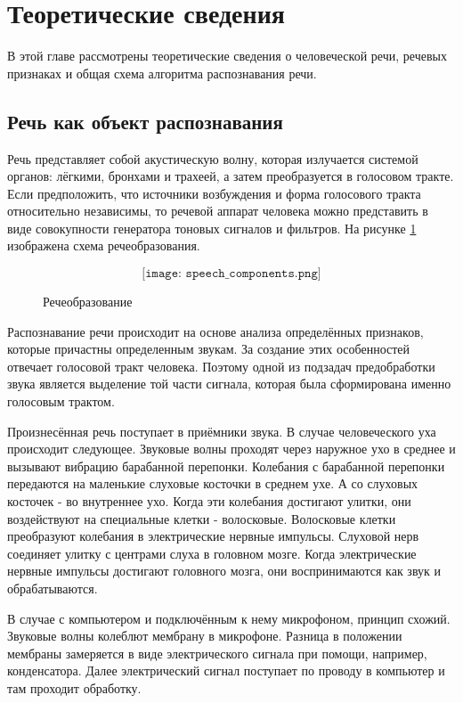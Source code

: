 \section{Теоретические сведения}
В этой главе рассмотрены теоретические сведения о человеческой речи, речевых признаках и общая схема алгоритма распознавания речи.

\subsection{Речь как объект распознавания}
Речь представляет собой акустическую волну, которая излучается системой органов: лёгкими, бронхами и трахеей, а затем преобразуется в голосовом тракте. Если предположить, что источники возбуждения и форма голосового тракта относительно независимы, то речевой аппарат человека можно представить в виде совокупности генератора тоновых сигналов и фильтров. На рисунке \ref{fig:speech_components} изображена схема речеобразования.

\begin{figure}[H]
	\[\texttt{[image: speech\_components.png]}\]
	\caption{Речеобразование}
	\label{fig:speech_components}
\end{figure}

Распознавание речи происходит на основе анализа определённых признаков, которые причастны определенным звукам. За создание этих особенностей отвечает голосовой тракт человека. Поэтому одной из подзадач предобработки звука является выделение той части сигнала, которая была сформирована именно голосовым трактом.

Произнесённая речь поступает в приёмники звука. В случае человеческого уха происходит следующее. Звуковые волны проходят через наружное ухо в среднее и вызывают вибрацию барабанной перепонки. Колебания с барабанной перепонки передаются на маленькие слуховые косточки в среднем ухе. А со слуховых косточек - во внутреннее ухо. Когда эти колебания достигают улитки, они воздействуют на специальные клетки - волосковые. Волосковые клетки преобразуют колебания в электрические нервные импульсы. Слуховой нерв соединяет улитку с центрами слуха в головном мозге. Когда электрические нервные импульсы достигают головного мозга, они воспринимаются как звук и обрабатываются.

В случае с компьютером и подключённым к нему микрофоном, принцип схожий. Звуковые волны колеблют мембрану в микрофоне. Разница в положении мембраны замеряется в виде электрического сигнала при помощи, например, конденсатора.  Далее электрический сигнал поступает по проводу в компьютер и там проходит обработку.


